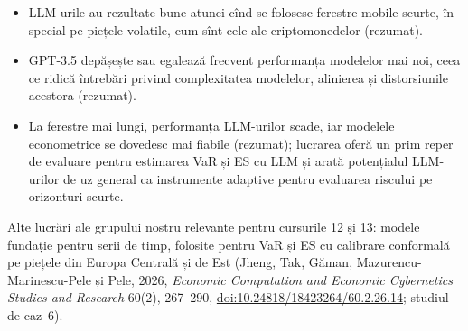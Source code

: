 \textbf{}
\begin{itemize}
\item {}%
{LLM-urile au rezultate bune atunci cînd se folosesc ferestre mobile scurte, în special pe piețele volatile, cum sînt cele ale criptomonedelor (rezumat).}
\item {}%
{GPT-3.5 depășește sau egalează frecvent performanța modelelor mai noi, ceea ce ridică întrebări privind complexitatea modelelor, alinierea și distorsiunile acestora (rezumat).}
\item {}%
{La ferestre mai lungi, performanța LLM-urilor scade, iar modelele econometrice se dovedesc mai fiabile (rezumat); lucrarea oferă un prim reper de evaluare pentru estimarea VaR și ES cu LLM și arată potențialul LLM-urilor de uz general ca instrumente adaptive pentru evaluarea riscului pe orizonturi scurte.}
\end{itemize}
{\footnotesize\color{FooterGray}%
{Alte lucrări ale grupului nostru relevante pentru cursurile 12 și 13: modele fundație pentru serii de timp, folosite pentru VaR și ES cu calibrare conformală pe piețele din Europa Centrală și de Est (Jheng, Tak, Găman, Mazurencu-Marinescu-Pele și Pele, 2026, \emph{Economic Computation and Economic Cybernetics Studies and Research} 60(2), 267--290, \href{https://doi.org/10.24818/18423264/60.2.26.14}{doi:10.24818/18423264/60.2.26.14}; studiul de caz~6).}}

